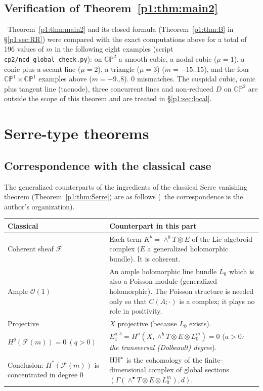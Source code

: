 \subsection{Verification of Theorem~\ref{p1:thm:main2}}
\tV\ Theorem~\ref{p1:thm:main2} and its closed formula (Theorem~\ref{p1:thm:B} in \S\ref{p1:sec:RR}) were compared with the exact computations above for a total of 196 values of $m$ in the following eight examples (script \texttt{cp2/ncd\_global\_check.py}): on $\mathbb{CP}^2$ a smooth cubic, a nodal cubic ($\mu=1$), a conic plus a secant line ($\mu=2$), a triangle ($\mu=3$) ($m=-15..15$), and the four $\mathbb{CP}^1\times\mathbb{CP}^1$ examples above ($m=-9..8$). 0 mismatches. The cuspidal cubic, conic plus tangent line (tacnode), three concurrent lines and non-reduced $D$ on $\mathbb{CP}^2$ are outside the scope of this theorem and are treated in \S\ref{p1:sec:local}.

\section{Serre-type theorems}\label{p1:sec:serre}
\subsection{Correspondence with the classical case}
The generalized counterparts of the ingredients of the classical Serre vanishing theorem (Theorem~\ref{p1:thm:Serre}) are as follows (\tK\ the correspondence is the author's organization).
\begin{center}\small
\begin{tabular}{p{4.6cm}p{9.8cm}}\toprule
Classical & Counterpart in this part\\\midrule
Coherent sheaf $\mathcal F$ & Each term $K^b=\wedge^bT\otimes E$ of the Lie algebroid complex ($E$ a generalized holomorphic bundle). It is coherent.\\
Ample $\mathcal O(1)$ & An ample holomorphic line bundle $L_0$ which is also a Poisson module (generalized holomorphic). The Poisson structure is needed only so that $C(A;\cdot)$ is a complex; it plays no role in positivity.\\
Projective & $X$ projective (because $L_0$ exists).\\
$H^q(\mathcal F(m))=0\ (q>0)$ & $E_1^{a,b}=H^a(X,\wedge^bT\otimes E\otimes L_0^m)=0$ (\emph{$a>0$: the transversal (Dolbeault) degree}).\\
Conclusion: $H^*(\mathcal F(m))$ is concentrated in degree 0 & $\mathrm{HH}^*$ is the cohomology of the finite-dimensional complex of global sections $(\Gamma(\wedge^\bullet T\otimes E\otimes L_0^m),d)$.\\\bottomrule
\end{tabular}
\end{center}

